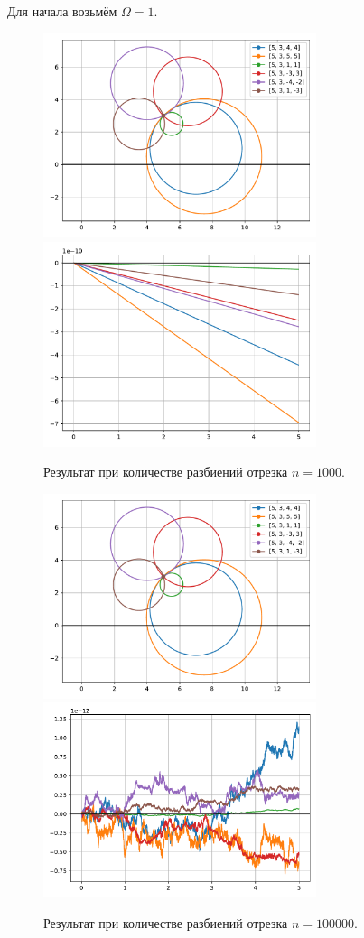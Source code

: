         Для начала возьмём \( \Omega = 1 \).
        \begin{figure}[H]
            \centering
            \includegraphics[width=8cm]{pictures/n1e5plot.pdf}
            \includegraphics[width=8cm]{pictures/n1e3conv.pdf}
            \caption{Результат при количестве разбиений отрезка \( n = 1000 \).}
        \end{figure}

        \begin{figure}[H]
            \centering
            \includegraphics[width=8cm]{pictures/n1e5plot.pdf}
            \includegraphics[width=8cm]{pictures/n1e5conv.pdf}
            \caption{Результат при количестве разбиений отрезка \( n = 100000 \).}
        \end{figure}

